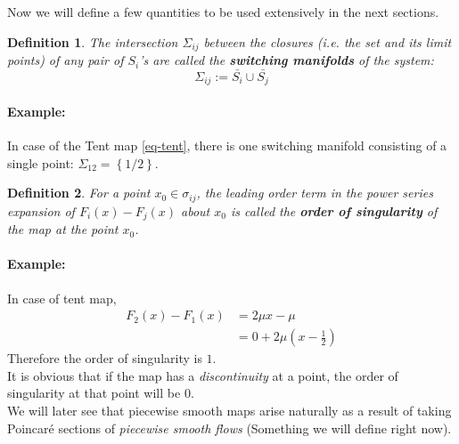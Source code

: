 \documentclass[oneside]{book}
\renewcommand{\(}{\begin{columns}}
\renewcommand{\)}{\end{columns}}
\newcommand{\<}[1]{\begin{column}{#1}}
\renewcommand{\>}{\end{column}}
\newcommand{\bb}[1]{\textbf{#1}}
\newcommand{\para}{\paragraph}
\newtheorem{definition}{Definition}[section]
\begin{document}
Now we will define a few quantities to be used extensively in the next 
sections.  

\begin{definition}
\label{def-switching_manifold}
The intersection $\Sigma_{ij}$ between the closures (i.e. the set and its limit points) of 
any pair of $S_i$'s are called the \bb{switching manifolds} of the system:\[
\Sigma_{ij}:=\bar{S_i}\cup\bar{S_j}
\]
\end{definition}
\para{Example:}
In case of the Tent map \eqref{eq-tent}, there is one switching manifold 
consisting of a single point:
$\Sigma_{12}=\left\{1/2\right\}$.  

\begin{definition}
\label{def-sing_order}
For a point $x_0\in\sigma_{ij}$, the leading order term in the power series 
expansion of $F_i(x)-F_j(x)$ about $x_0$ is called the \bb{order of singularity} of the 
map at the point $x_0$.  
\end{definition}
\para{Example:}
In case of tent map, 
\begin{align}
F_2(x)-F_1(x)&=2\mu x-\mu\\
&=0+2\mu(x-\frac{1}{2})
\end{align}
Therefore the order of singularity is $1$. \\


It is obvious that if the map has a \emph{discontinuity} at a point, the order 
of singularity at that point will be $0$. \\ 


We will later see that piecewise smooth maps arise naturally as a result of 
taking Poincaré sections of \emph{piecewise smooth flows} (Something we will 
define right now).
\end{document}
